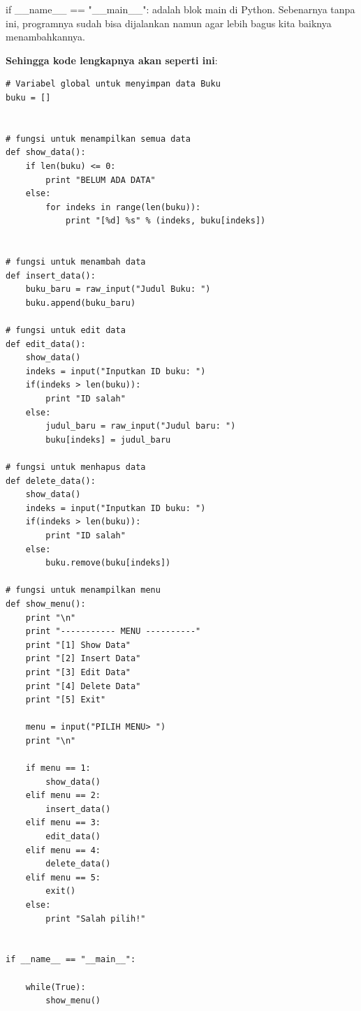 if \_\_name\_\_ == "\_\_main\_\_": adalah blok main di Python. Sebenarnya tanpa ini, programnya sudah bisa dijalankan namun agar lebih bagus kita baiknya menambahkannya.
\par\textbf{Sehingga kode lengkapnya akan seperti ini}:
\begin{lstlisting}
# Variabel global untuk menyimpan data Buku
buku = []


# fungsi untuk menampilkan semua data
def show_data():
    if len(buku) <= 0:
        print "BELUM ADA DATA"
    else:
        for indeks in range(len(buku)):
            print "[%d] %s" % (indeks, buku[indeks])


# fungsi untuk menambah data
def insert_data():
    buku_baru = raw_input("Judul Buku: ")
    buku.append(buku_baru)

# fungsi untuk edit data
def edit_data():
    show_data()
    indeks = input("Inputkan ID buku: ")
    if(indeks > len(buku)):
        print "ID salah"
    else:
        judul_baru = raw_input("Judul baru: ")
        buku[indeks] = judul_baru

# fungsi untuk menhapus data
def delete_data():
    show_data()
    indeks = input("Inputkan ID buku: ")
    if(indeks > len(buku)):
        print "ID salah"
    else:
        buku.remove(buku[indeks])

# fungsi untuk menampilkan menu
def show_menu():
    print "\n"
    print "----------- MENU ----------"
    print "[1] Show Data"
    print "[2] Insert Data"
    print "[3] Edit Data"
    print "[4] Delete Data"
    print "[5] Exit"
    
    menu = input("PILIH MENU> ")
    print "\n"

    if menu == 1:
        show_data()
    elif menu == 2:
        insert_data()
    elif menu == 3:
        edit_data()
    elif menu == 4:
        delete_data()
    elif menu == 5:
        exit()
    else:
        print "Salah pilih!"


if __name__ == "__main__":

    while(True):
        show_menu()
\end{lstlisting}
